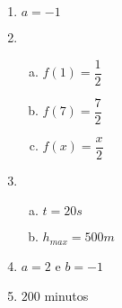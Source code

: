 \begin{res}
\begin{multicols}{2}
\begin{enumerate}[(1)]
            \item $a=-1$

            \item
                \begin{enumerate}[(a)]
                    \item $f\left( 1\right)=\dfrac{1}{2}$
                    \item  $f\left( 7\right)=\dfrac{7}{2}$
                    \item  $f\left( x\right)=\dfrac{x}{2}$
                \end{enumerate}

            \item
                \begin{enumerate}[(a)]
                    \item $t=20s$
                    \item  $h_{max}=500m$
                \end{enumerate}

            \item $a=2$ e $b=-1$

            \item $200$ minutos

        \end{enumerate}
    \end{multicols}
\end{res}

